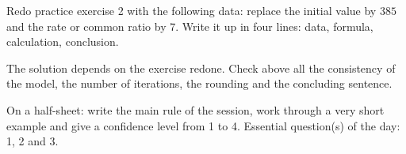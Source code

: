 
\begin{homework}Redo practice exercise 2 with the following data: replace the initial value by $385$ and the rate or common ratio by $7$. Write it up in four lines: data, formula, calculation, conclusion.\end{homework}
\begin{solution}The solution depends on the exercise redone. Check above all the consistency of the model, the number of iterations, the rounding and the concluding sentence.\end{solution}

\begin{exitticket}[3 minutes]On a half-sheet: write the main rule of the session, work through a very short example and give a confidence level from 1 to 4. Essential question(s) of the day: 1, 2 and 3.\end{exitticket}

